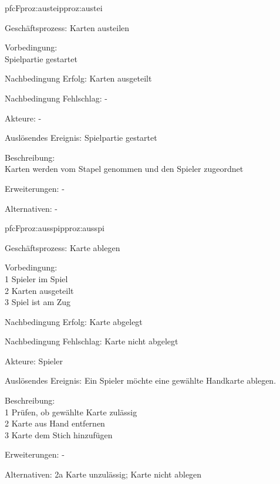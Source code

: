 \begin{description}[leftmargin=3em, style=sameline]
	\begin{php}{pfc}{F}{proz:austei}{pproz:austei}
		\item [Geschäftsprozess:] Karten austeilen
		\item [Vorbedingung:]\hfill\\
		Spielpartie gestartet
		\item [Nachbedingung Erfolg:] Karten ausgeteilt
		\item [Nachbedingung Fehlschlag:] -
		\item [Akteure:] -
		\item [Auslösendes Ereignis:] Spielpartie gestartet
		\item [Beschreibung:]\hfill\\
		Karten werden vom Stapel genommen und den Spieler zugeordnet
		\item [Erweiterungen:] -
		\item [Alternativen:] -	
	\end{php}
	
	\begin{php}{pfc}{F}{proz:ausspi}{pproz:ausspi}
		\item [Geschäftsprozess:] Karte ablegen
		\item [Vorbedingung:] \hfill\\
		1 Spieler im Spiel \\
		2 Karten ausgeteilt \\
		3 Spiel ist am Zug
		\item [Nachbedingung Erfolg:] Karte abgelegt
		\item [Nachbedingung Fehlschlag:] Karte nicht abgelegt
		\item [Akteure:] Spieler
		\item [Auslösendes Ereignis:] Ein Spieler möchte eine gewählte Handkarte ablegen.
		\item [Beschreibung:]\hfill\\
		1 Prüfen, ob gewählte Karte zulässig \\
		2 Karte aus Hand entfernen \\
		3 Karte dem Stich hinzufügen
		\item [Erweiterungen:] -
		\item [Alternativen:] 2a Karte unzulässig; Karte nicht ablegen	
	\end{php}
	
	
	

\end{description}
